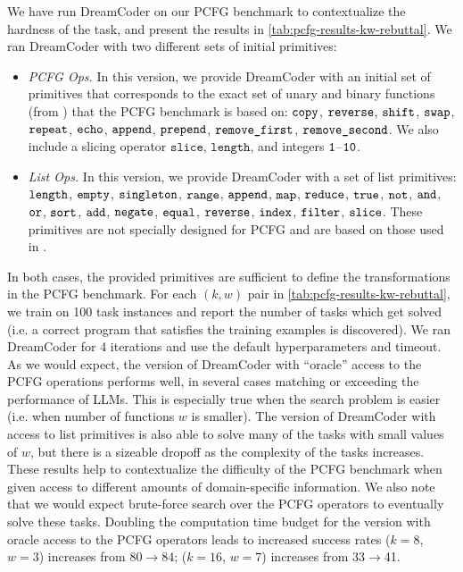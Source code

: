 We have run DreamCoder \cite{ellis2021dreamcoder} on our PCFG benchmark to contextualize the hardness of the task, and present the results in \cref{tab:pcfg-results-kw-rebuttal}.
We ran DreamCoder with two different sets of initial primitives:
\begin{itemize}[leftmargin=*]
    \item
        \textit{PCFG Ops.}
        In this version, we provide DreamCoder with an initial set of primitives that corresponds to the exact set of unary and binary functions (from \cite{hupkes2020compositionality}) that the PCFG benchmark is based on:
        $\tt{copy}$,
        $\tt{reverse}$,
        $\tt{shift}$,
        $\tt{swap}$,
        $\tt{repeat}$,
        $\tt{echo}$,
        $\tt{append}$,
        $\tt{prepend}$,
        $\tt{remove\_first}$,
        $\tt{remove\_second}$.
        We also include a slicing operator $\texttt{slice}$, $\texttt{length}$, and integers $\tt{1}$--$\tt{10}$.
    \item
        \textit{List Ops.}
        In this version, we provide DreamCoder with a set of list primitives:
        $\tt{length}$,
        $\tt{empty}$,
        $\tt{singleton}$,
        $\tt{range}$,
        $\tt{append}$,
        $\tt{map}$,
        $\tt{reduce}$,
        $\tt{true}$,
        $\tt{not}$,
        $\tt{and}$,
        $\tt{or}$,
        $\tt{sort}$,
        $\tt{add}$,
        $\tt{negate}$,
        $\tt{equal}$,
        $\tt{reverse}$,
        $\tt{index}$,
        $\tt{filter}$,
        $\tt{slice}$. These primitives are not specially designed for PCFG and are based on those used in \cite{ellis2021dreamcoder,ellis2018learning}. 
\end{itemize}

In both cases, the provided primitives are sufficient to define the transformations in the PCFG benchmark.
For each $(k, w)$ pair in \cref{tab:pcfg-results-kw-rebuttal}, we train on 100 task instances and report the number of tasks which get solved (i.e. a correct program that satisfies the training examples is discovered). %
We ran DreamCoder for 4 iterations and use the default hyperparameters and timeout. As we would expect, the version of DreamCoder with ``oracle'' access to the PCFG operations performs well, in several cases matching or exceeding the performance of LLMs. This is especially true when the search problem is easier (i.e. when number of functions $w$ is smaller). The version of DreamCoder with access to list primitives is also able to solve many of the tasks with small values of $w$, but there is a sizeable dropoff as the complexity of the tasks increases. These results help to contextualize the difficulty of the PCFG benchmark when given access to different amounts of domain-specific information. We also note that we would expect brute-force search over the PCFG operators to eventually solve these tasks. Doubling the computation time budget for the version with oracle access to the PCFG operators leads to increased success rates ($k=8$, $w=3$) increases from 80$\rightarrow$84; ($k=16$, $w=7$) increases from 33$\rightarrow$41.

